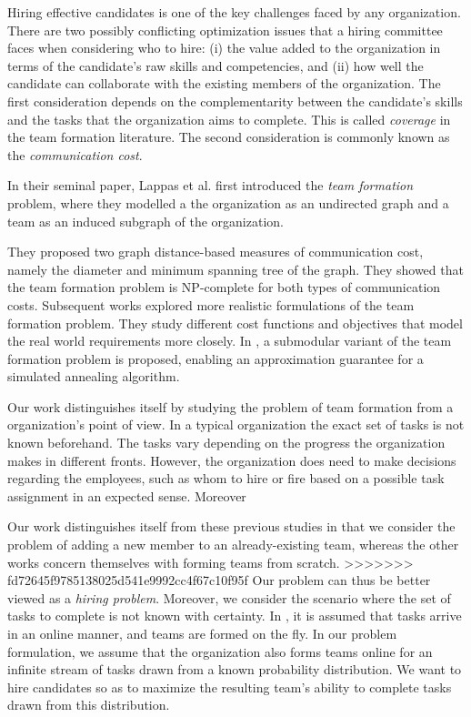 Hiring effective candidates is one of the key challenges faced by any organization.
There are two possibly conflicting optimization issues that a hiring committee faces when considering who to hire: 
(i) the value added to the organization in terms of the candidate's raw skills and competencies, and 
(ii) how well the candidate can collaborate with the existing members of the organization.
The first consideration depends on the complementarity between the candidate's skills and the tasks that the organization aims to complete. 
This is called \textit{coverage} in the team formation literature.
The second consideration is commonly known as the \textit{communication cost}.

In their seminal paper, Lappas et al. \cite{lappas2009finding} first introduced the \textit{team formation} problem, where they modelled a the organization as an undirected graph and a team as an induced subgraph of the organization.

They proposed two graph distance-based measures of communication cost, namely the diameter and minimum spanning tree of the graph. 
They showed that the team formation problem is NP-complete for both types of communication costs. 
Subsequent works \cite{sozio2010community, kargar2011discovering, anagnostopoulos2010power, rangapuram2013towards} explored more realistic formulations of the team  formation problem. They study different cost functions and objectives that model the real world requirements more closely.
In \cite{bhowmik2014submodularity}, a submodular variant of the team formation problem is proposed, enabling an approximation guarantee for a simulated annealing algorithm.

Our work distinguishes itself by studying the problem of team formation from a organization's point of view. In a typical organization the exact set of tasks is not known beforehand. The tasks vary depending on the progress the organization makes in different fronts. However, the organization does need to make decisions regarding the employees, such as whom to hire or fire based on a possible task assignment in an expected sense. Moreover  

Our work distinguishes itself from these previous studies in that we consider the problem of adding a new member to an already-existing team, whereas the other works concern themselves with forming teams from scratch.
>>>>>>> fd72645f9785138025d541e9992cc4f67c10f95f
Our problem can thus be better viewed as a \textit{hiring problem}. Moreover, we consider the scenario where the set of tasks to complete is not known with certainty.
In \cite{anagnostopoulos2012online}, it is assumed that tasks arrive in an online manner, and teams are formed on the fly.
In our problem formulation, we assume that the organization also forms teams online for an infinite stream of tasks drawn from a known probability distribution.
We want to hire candidates so as to maximize the resulting team's ability to complete tasks drawn from this distribution.

